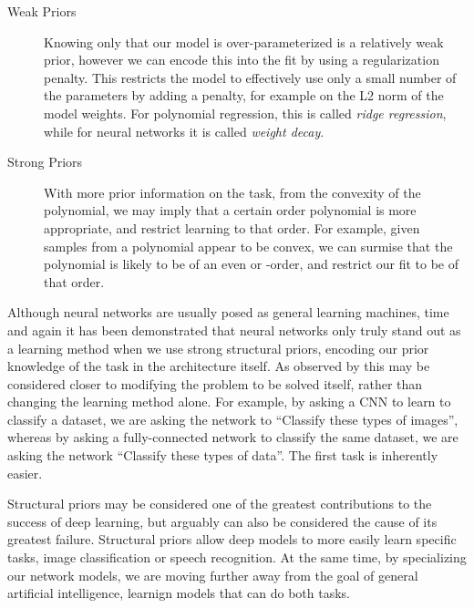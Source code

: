 \documentclass[thesis]{subfiles}
\begin{document}
	\begin{description}
	\item[Weak Priors]
	Knowing only that our model is over-parameterized is a relatively weak prior, however we can encode this into the fit by using a regularization penalty. This restricts the model to effectively use only a small number of the parameters by adding a penalty, for example on the L2 norm of the model weights. For polynomial regression, this is called \emph{ridge regression}, while for neural networks it is called \emph{weight decay}.
	
	\item[Strong Priors]
	With more prior information on the task, \eg from the convexity of the polynomial, we may imply that a certain order polynomial is more appropriate, and restrict learning to that order. For example, given samples from a polynomial appear to be convex, we can surmise that the polynomial is likely to be of an even or -order, and restrict our fit to be of that order. 
    \end{description}
    
	Although neural networks are usually posed as general learning machines, time and again it has been demonstrated that neural networks only truly stand out as a learning method when we use strong structural priors, encoding our prior knowledge of the task in the architecture itself. As observed by \citet{denker1987large} this may be considered closer to modifying the problem to be solved itself, rather than changing the learning method alone. For example, by asking a CNN to learn to classify a dataset, we are asking the network to ``Classify these types of images'', whereas by asking a fully-connected network to classify the same dataset, we are asking the network ``Classify these types of data''. The first task is inherently easier.

    Structural priors may be considered one of the greatest contributions to the success of deep learning, but arguably can also be considered the cause of its greatest failure. Structural priors allow deep models to more easily learn specific tasks, \eg image classification or speech recognition. At the same time, by specializing our network models, we are moving further away from the goal of general artificial intelligence, \ie learnign models that can do both tasks.
\end{document}
